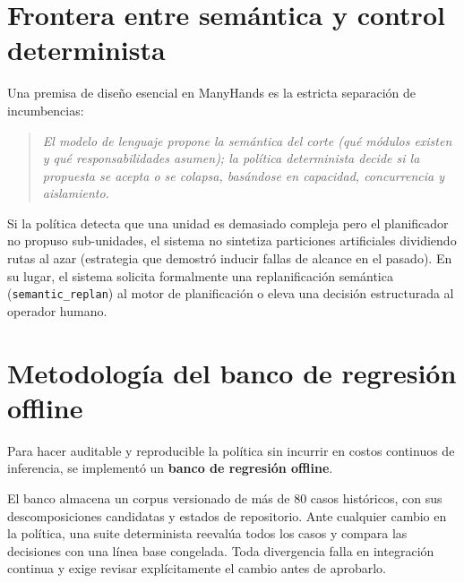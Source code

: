 \section{Frontera entre semántica y control determinista}

Una premisa de diseño esencial en ManyHands es la estricta separación de incumbencias:

\begin{quote}
\emph{El modelo de lenguaje propone la semántica del corte (qué módulos existen y qué responsabilidades asumen); la política determinista decide si la propuesta se acepta o se colapsa, basándose en capacidad, concurrencia y aislamiento.}
\end{quote}

Si la política detecta que una unidad es demasiado compleja pero el planificador no propuso sub-unidades, el sistema no sintetiza particiones artificiales dividiendo rutas al azar (estrategia que demostró inducir fallas de alcance en el pasado). En su lugar, el sistema solicita formalmente una replanificación semántica (\texttt{semantic\_replan}) al motor de planificación o eleva una decisión estructurada al operador humano.

\section{Metodología del banco de regresión offline}

Para hacer auditable y reproducible la política sin incurrir en costos
continuos de inferencia, se implementó un \textbf{banco de regresión offline}.

El banco almacena un corpus versionado de más de 80 casos históricos, con sus
descomposiciones candidatas y estados de repositorio. Ante cualquier cambio en
la política, una suite determinista reevalúa todos los casos y compara las
decisiones con una línea base congelada. Toda divergencia falla en integración
continua y exige revisar explícitamente el cambio antes de aprobarlo.
